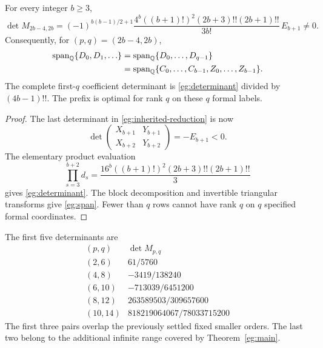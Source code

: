 \begin{theorem}\label{eg:main}
For every integer $b\ge3$,
\begin{equation}\label{eg:determinant}
 \boxed{\displaystyle
 \det M_{2b-4,2b}
 =(-1)^{b(b-1)/2+1}
   \frac{4^b((b+1)!)^2(2b+3)!!(2b+1)!!}{3b!}\,E_{b+1}\ne0.}
\end{equation}
Consequently, for $(p,q)=(2b-4,2b)$,
\begin{align}\label{eg:span}
 \operatorname{span}_{\mathbb Q}\{D_0,D_1,\ldots\}
 &=\operatorname{span}_{\mathbb Q}\{D_0,\ldots,D_{q-1}\}\notag\\
 &=\operatorname{span}_{\mathbb Q}
     \{C_0,\ldots,C_{b-1},Z_0,\ldots,Z_{b-1}\}.
\end{align}
The complete first-$q$ coefficient determinant is
\eqref{eg:determinant} divided by $(4b-1)!!$. The prefix is optimal
for rank $q$ on these $q$ formal labels.
\end{theorem}

\begin{proof}
The last determinant in \eqref{eg:inherited-reduction} is now
\[
 \det\begin{pmatrix}X_{b+1}&Y_{b+1}\\X_{b+2}&Y_{b+2}\end{pmatrix}
 =-E_{b+1}<0.
\]
The elementary product evaluation
\[
 \prod_{s=3}^{b+2}d_s
 =\frac{16^b((b+1)!)^2(2b+3)!!(2b+1)!!}{3}
\]
gives \eqref{eg:determinant}. The block decomposition and invertible
triangular transforms give \eqref{eg:span}. Fewer than $q$ rows cannot
have rank $q$ on $q$ specified formal coordinates.
\end{proof}

The first five determinants are
\[
\begin{array}{c|c}
(p,q)&\det M_{p,q}\\\hline
(2,6)&61/5760\\
(4,8)&-3419/138240\\
(6,10)&-713039/6451200\\
(8,12)&263589503/309657600\\
(10,14)&818219064067/78033715200
\end{array}
\]
The first three pairs overlap the previously settled fixed smaller
orders. The last two belong to the additional infinite range covered
by Theorem~\ref{eg:main}.

